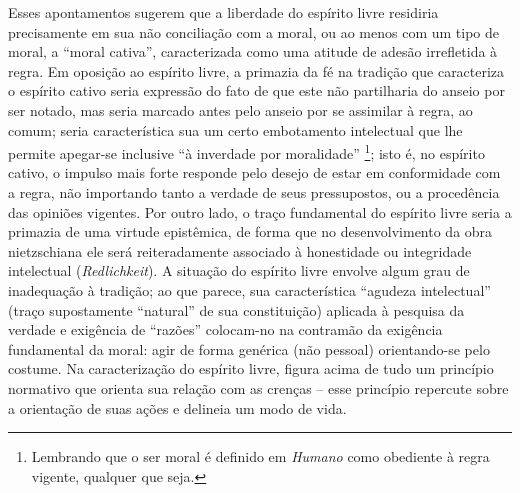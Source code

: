 \documentclass[
	12pt,				%
	openright,			%
	oneside,			%
	a4paper,			%
	english,			%
	french,				%
	spanish,			%
	brazil				%
	]{abntex2}
\begin{document}
Esses apontamentos sugerem que a liberdade do espírito livre residiria precisamente em sua não conciliação com a moral, ou ao menos com um tipo de moral, a “moral cativa”, caracterizada como uma atitude de adesão irrefletida à regra. Em oposição ao espírito livre, a primazia da fé na tradição que caracteriza o espírito cativo seria expressão do fato de que este não partilharia do anseio por ser notado, mas seria marcado antes pelo anseio por se assimilar à regra, ao comum; seria característica sua um certo embotamento intelectual que lhe permite apegar-se inclusive “à inverdade por moralidade”
\footnote{Lembrando que o ser moral é definido em \textit{Humano} como obediente à regra vigente, qualquer que seja.}; 
isto é, no espírito cativo, o impulso mais forte responde pelo desejo de estar em conformidade com a regra, não importando tanto a verdade de seus pressupostos, ou a procedência das opiniões vigentes. Por outro lado, o traço fundamental do espírito livre seria a primazia de uma virtude epistêmica, de forma que no desenvolvimento da obra nietzschiana ele será reiteradamente associado à honestidade ou integridade intelectual (\textit{Redlichkeit}). A situação do espírito livre envolve algum grau de inadequação à tradição; ao que parece, sua característica “agudeza intelectual” (traço supostamente “natural” de sua constituição) aplicada à pesquisa da verdade e exigência de “razões” colocam-no na contramão da exigência fundamental da moral: agir de forma genérica (não pessoal) orientando-se pelo costume. Na caracterização do espírito livre, figura acima de tudo um princípio normativo que orienta sua relação com as crenças – esse princípio repercute sobre a orientação de suas ações e delineia um modo de vida. 
\end{document}
